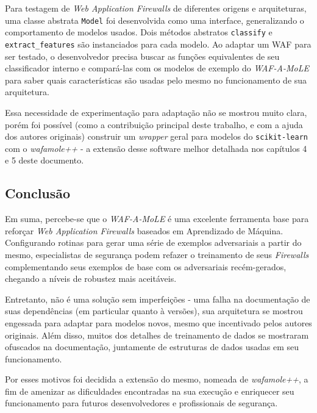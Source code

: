 Para testagem de \textit{Web Application Firewalls} de diferentes origens e arquiteturas, uma classe abstrata \verb+Model+ foi desenvolvida como uma interface, generalizando o comportamento de modelos usados. Dois métodos abstratos \verb+classify+ e \verb+extract_features+ são instanciados para cada modelo. Ao adaptar um WAF para ser testado, o desenvolvedor precisa buscar as funções equivalentes de seu classificador interno e compará-las com os modelos de exemplo do \textit{WAF-A-MoLE} para saber quais características são usadas pelo mesmo no funcionamento de sua arquitetura.

Essa necessidade de experimentação para adaptação não se mostrou muito clara, porém foi possível (como a contribuição principal deste trabalho, e com a ajuda dos autores originais) construir um \textit{wrapper} geral para modelos do \verb+scikit-learn+ com o \textit{wafamole++} - a extensão desse software melhor detalhada nos capítulos 4 e 5 deste documento.

\subsection{Conclusão}
Em suma, percebe-se que o \textit{WAF-A-MoLE} é uma excelente ferramenta base para reforçar \textit{Web Application Firewalls} baseados em Aprendizado de Máquina. Configurando rotinas para gerar uma série de exemplos adversariais a partir do mesmo, especialistas de segurança podem refazer o treinamento de seus \textit{Firewalls} complementando seus exemplos de base com os adversariais recém-gerados, chegando a níveis de robustez mais aceitáveis. 

Entretanto, não é uma solução sem imperfeições - uma falha na documentação de suas dependências (em particular quanto à versões), sua arquitetura se mostrou engessada para adaptar para modelos novos, mesmo que incentivado pelos autores originais. Além disso, muitos dos detalhes de treinamento de dados se mostraram ofuscados na documentação, juntamente de estruturas de dados usadas em seu funcionamento.

Por esses motivos foi decidida a extensão do mesmo, nomeada de \textit{wafamole++}, a fim de amenizar as dificuldades encontradas na sua execução e enriquecer seu funcionamento para futuros desenvolvedores e profissionais de segurança.


